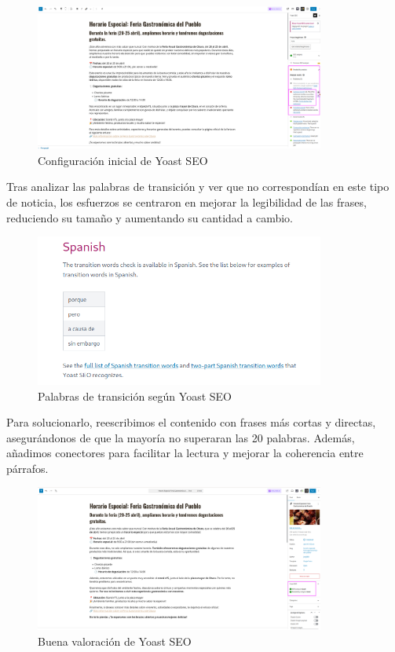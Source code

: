 \documentclass[a4paper]{article}
\begin{document}
\begin{figure}[H]
    \centering
    \includegraphics[width=0.85\textwidth]{images/yoast3.png}
    \caption{Configuración inicial de Yoast SEO}
\end{figure}

Tras analizar las palabras de transición y ver que no correspondían en este tipo de noticia, los esfuerzos se centraron en mejorar la legibilidad de las frases, reduciendo su tamaño y aumentando su cantidad a cambio.

\begin{figure}[H]
    \centering
    \includegraphics[width=0.85\textwidth]{images/yoast31.png}
    \caption{Palabras de transición según Yoast SEO}
\end{figure}

Para solucionarlo, reescribimos el contenido con frases más cortas y directas, asegurándonos de que la mayoría no superaran las 20 palabras. Además, añadimos conectores para facilitar la lectura y mejorar la coherencia entre párrafos.

 \begin{figure}[H]
    \centering
    \includegraphics[width=0.85\textwidth]{images/yoast4.png}
    \caption{Buena valoración de Yoast SEO}
\end{figure}
\end{document}

